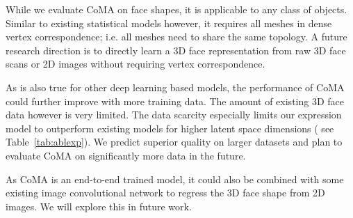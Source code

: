 While we evaluate CoMA on face shapes, it is applicable to any class of objects. Similar to existing statistical models however, it requires all meshes in dense vertex correspondence; i.e. all meshes need to share the same topology. A future research direction is to directly learn a 3D face representation from raw 3D face scans or 2D images without requiring vertex correspondence.

As is also true for other deep learning based models, the performance of CoMA could further improve with more training data. The amount of existing 3D face data however is very limited. The data scarcity especially limits our expression model to outperform existing models for higher latent space dimensions ( see Table~\ref{tab:ablexp}). We predict superior quality on larger datasets and plan to evaluate CoMA on significantly more data in the future.

As CoMA is an end-to-end trained model, it could also be combined with some existing image convolutional network to regress the 3D face shape from 2D images. We will explore this in future work. 





